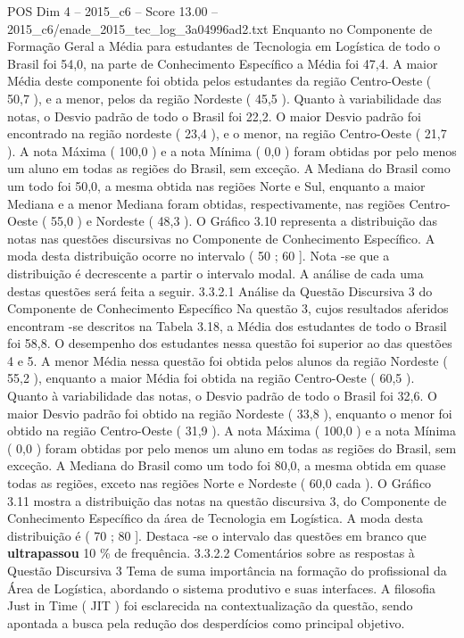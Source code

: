 \begin{textsample}{POS Dim 4 – 2015\_c6 – Score 13.00 – 2015\_c6/enade\_2015\_tec\_log\_3a04996ad2.txt}
Enquanto no Componente de Formação Geral a Média para estudantes de Tecnologia em Logística de todo o Brasil foi 54,0, na parte de Conhecimento Específico a Média foi 47,4.
A maior Média deste componente foi obtida pelos estudantes da região Centro-Oeste ( 50,7 ), e a menor, pelos da região Nordeste ( 45,5 ).
Quanto à variabilidade das notas, o Desvio padrão de todo o Brasil foi 22,2.
O maior Desvio padrão foi encontrado na região nordeste ( 23,4 ), e o menor, na região Centro-Oeste ( 21,7 ).
A nota Máxima ( 100,0 ) e a nota Mínima ( 0,0 ) foram obtidas por pelo menos um aluno em todas as regiões do Brasil, sem exceção.
A Mediana do Brasil como um todo foi 50,0, a mesma obtida nas regiões Norte e Sul, enquanto a maior Mediana e a menor Mediana foram obtidas, respectivamente, nas regiões Centro-Oeste ( 55,0 ) e Nordeste ( 48,3 ).
O Gráfico 3.10 representa a distribuição das notas nas questões discursivas no Componente de Conhecimento Específico.
A moda desta distribuição ocorre no intervalo ( 50 ; 60 ].
Nota -se que a distribuição é decrescente a partir o intervalo modal.
A análise de cada uma destas questões será feita a seguir. 3.3.2.1 Análise da Questão Discursiva 3 do Componente de Conhecimento Específico Na questão 3, cujos resultados aferidos encontram -se descritos na Tabela 3.18, a Média dos estudantes de todo o Brasil foi 58,8.
O desempenho dos estudantes nessa questão foi superior ao das questões 4 e 5.
A menor Média nessa questão foi obtida pelos alunos da região Nordeste ( 55,2 ), enquanto a maior Média foi obtida na região Centro-Oeste ( 60,5 ).
Quanto à variabilidade das notas, o Desvio padrão de todo o Brasil foi 32,6.
O maior Desvio padrão foi obtido na região Nordeste ( 33,8 ), enquanto o menor foi obtido na região Centro-Oeste ( 31,9 ).
A nota Máxima ( 100,0 ) e a nota Mínima ( 0,0 ) foram obtidas por pelo menos um aluno em todas as regiões do Brasil, sem exceção.
A Mediana do Brasil como um todo foi 80,0, a mesma obtida em quase todas as regiões, exceto nas regiões Norte e Nordeste ( 60,0 cada ).
O Gráfico 3.11 mostra a distribuição das notas na questão discursiva 3, do Componente de Conhecimento Específico da área de Tecnologia em Logística.
A moda desta distribuição é ( 70 ; 80 ].
Destaca -se o intervalo das questões em branco que \textbf{ultrapassou} 10 \% de frequência. 3.3.2.2 Comentários sobre as respostas à Questão Discursiva 3 Tema de suma importância na formação do profissional da Área de Logística, abordando o sistema produtivo e suas interfaces.
A filosofia Just in Time ( JIT ) foi esclarecida na contextualização da questão, sendo apontada a busca pela redução dos desperdícios como principal objetivo.

\end{textsample}
